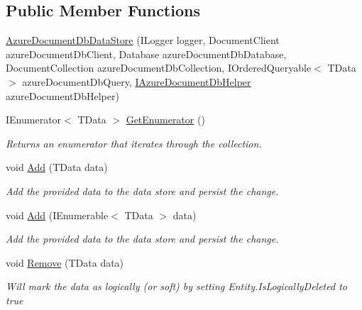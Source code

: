 \subsection*{Public Member Functions}
\begin{DoxyCompactItemize}
\item 
\hyperlink{classCqrs_1_1Azure_1_1DocumentDb_1_1DataStores_1_1AzureDocumentDbDataStore_add3f66df634a9e9ca0cbd4498e4478f6_add3f66df634a9e9ca0cbd4498e4478f6}{Azure\+Document\+Db\+Data\+Store} (I\+Logger logger, Document\+Client azure\+Document\+Db\+Client, Database azure\+Document\+Db\+Database, Document\+Collection azure\+Document\+Db\+Collection, I\+Ordered\+Queryable$<$ T\+Data $>$ azure\+Document\+Db\+Query, \hyperlink{interfaceCqrs_1_1Azure_1_1DocumentDb_1_1IAzureDocumentDbHelper}{I\+Azure\+Document\+Db\+Helper} azure\+Document\+Db\+Helper)
\item 
I\+Enumerator$<$ T\+Data $>$ \hyperlink{classCqrs_1_1Azure_1_1DocumentDb_1_1DataStores_1_1AzureDocumentDbDataStore_af83791e306b51fd3ee0b710232e83756_af83791e306b51fd3ee0b710232e83756}{Get\+Enumerator} ()
\begin{DoxyCompactList}\small\item\em Returns an enumerator that iterates through the collection. \end{DoxyCompactList}\item 
void \hyperlink{classCqrs_1_1Azure_1_1DocumentDb_1_1DataStores_1_1AzureDocumentDbDataStore_ad17e6e846430e617af24be48b77d1528_ad17e6e846430e617af24be48b77d1528}{Add} (T\+Data data)
\begin{DoxyCompactList}\small\item\em Add the provided {\itshape data}  to the data store and persist the change. \end{DoxyCompactList}\item 
void \hyperlink{classCqrs_1_1Azure_1_1DocumentDb_1_1DataStores_1_1AzureDocumentDbDataStore_a2d91050f17273687e44a121623803e7a_a2d91050f17273687e44a121623803e7a}{Add} (I\+Enumerable$<$ T\+Data $>$ data)
\begin{DoxyCompactList}\small\item\em Add the provided {\itshape data}  to the data store and persist the change. \end{DoxyCompactList}\item 
void \hyperlink{classCqrs_1_1Azure_1_1DocumentDb_1_1DataStores_1_1AzureDocumentDbDataStore_abf9bcf75e8e0e1ec86155bf4da1a7b7a_abf9bcf75e8e0e1ec86155bf4da1a7b7a}{Remove} (T\+Data data)
\begin{DoxyCompactList}\small\item\em Will mark the {\itshape data}  as logically (or soft) by setting Entity.\+Is\+Logically\+Deleted to true \end{DoxyCompactList}\item 

\end{DoxyCompactItemize}
